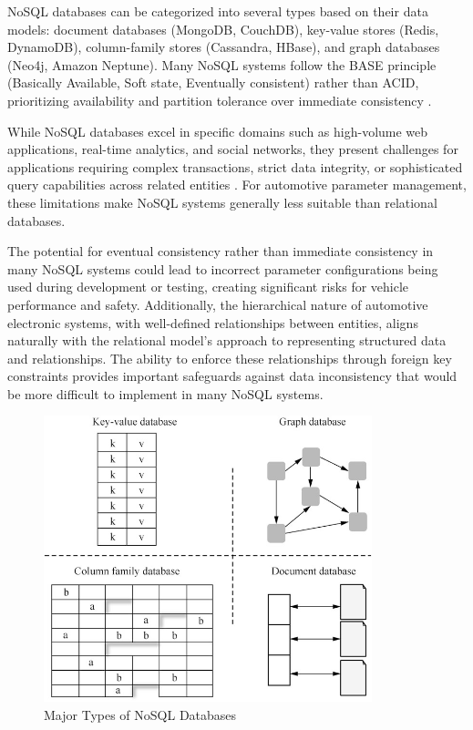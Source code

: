 NoSQL databases can be categorized into several types based on their data models: document databases (MongoDB, CouchDB), key-value stores (Redis, DynamoDB), column-family stores (Cassandra, HBase), and graph databases (Neo4j, Amazon Neptune). Many NoSQL systems follow the BASE principle (Basically Available, Soft state, Eventually consistent) rather than ACID, prioritizing availability and partition tolerance over immediate consistency \cite{brewer2000robust}.

While NoSQL databases excel in specific domains such as high-volume web applications, real-time analytics, and social networks, they present challenges for applications requiring complex transactions, strict data integrity, or sophisticated query capabilities across related entities \cite{kleppmann2017conflict}. For automotive parameter management, these limitations make NoSQL systems generally less suitable than relational databases.

The potential for eventual consistency rather than immediate consistency in many NoSQL systems could lead to incorrect parameter configurations being used during development or testing, creating significant risks for vehicle performance and safety. Additionally, the hierarchical nature of automotive electronic systems, with well-defined relationships between entities, aligns naturally with the relational model's approach to representing structured data and relationships. The ability to enforce these relationships through foreign key constraints provides important safeguards against data inconsistency that would be more difficult to implement in many NoSQL systems.

\begin{figure}[ht]
    \centering
    \includegraphics[width=0.85\textwidth]{figures/nosql_types.png}
    \caption{Major Types of NoSQL Databases \cite{gaussdbdatabase}}
    \label{fig:nosql-types}
\end{figure}

